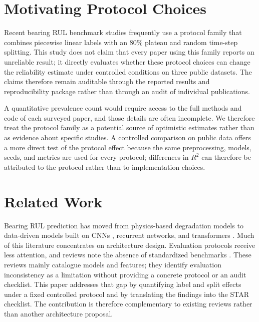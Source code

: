 \documentclass[pdflatex,sn-mathphys-num]{sn-jnl}
\begin{document}
\section{Motivating Protocol Choices}
Recent bearing RUL benchmark studies frequently use a protocol family that combines piecewise linear labels with an 80\% plateau and random time-step splitting. This study does not claim that every paper using this family reports an unreliable result; it directly evaluates whether these protocol choices can change the reliability estimate under controlled conditions on three public datasets. The claims therefore remain auditable through the reported results and reproducibility package rather than through an audit of individual publications.

A quantitative prevalence count would require access to the full methods and code of each surveyed paper, and those details are often incomplete. We therefore treat the protocol family as a potential source of optimistic estimates rather than as evidence about specific studies. A controlled comparison on public data offers a more direct test of the protocol effect because the same preprocessing, models, seeds, and metrics are used for every protocol; differences in $R^2$ can therefore be attributed to the protocol rather than to implementation choices.

\section{Related Work}
Bearing RUL prediction has moved from physics-based degradation models \cite{paris1963critical,kotzalas2004fatigue,li2022physics} to data-driven models built on CNNs \cite{ince2016real}, recurrent networks, and transformers \cite{rul_lstm_uq_2022,reg_lstm_2021,transformer_tim_2023}. Much of this literature concentrates on architecture design. Evaluation protocols receive less attention, and reviews note the absence of standardized benchmarks \cite{zhao2021deep,caesarendra2021machine}. These reviews mainly catalogue models and features; they identify evaluation inconsistency as a limitation without providing a concrete protocol or an audit checklist. This paper addresses that gap by quantifying label and split effects under a fixed controlled protocol and by translating the findings into the STAR checklist. The contribution is therefore complementary to existing reviews rather than another architecture proposal.
\end{document}
